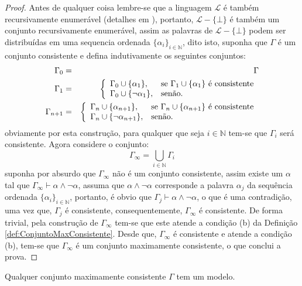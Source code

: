\begin{proof}
  Antes de qualquer coisa lembre-se que a linguagem $\mathcal{L}$ é também recursivamente enumerável (detalhes em \cite{ullman1992}), portanto, $\mathcal{L} - \{\bot\}$ é também um conjunto recursivamente enumerável, assim as palavras de $\mathcal{L} - \{\bot\}$ podem ser distribuídas em uma sequencia ordenada $\{\alpha_i\}_{i \in \mathbb{N}}$, dito isto, suponha que $\Gamma$ é um conjunto consistente e defina indutivamente os seguintes conjuntos:
  \begin{eqnarray*}
    \Gamma_0 & = & \Gamma\\
    \Gamma_1 & = & \left\{\begin{array}{ll}	\Gamma_0 \cup \{\alpha_1\}, & \hbox{se } \Gamma_1 \cup \{\alpha_1\} \hbox{ é consistente}\\ \Gamma_0 \cup \{\neg \alpha_1\},  & \hbox{senão.}\end{array}\right.\\
    \Gamma_{n+1} & = & \left\{\begin{array}{ll}	\Gamma_n \cup \{\alpha_{n+1}\}, & \hbox{se } \Gamma_n \cup \{\alpha_{n+1}\} \hbox{ é consistente}\\ \Gamma_n \cup \{\neg \alpha_{n+1}\},  & \hbox{senão.}\end{array}\right.
  \end{eqnarray*}
  obviamente por esta construção, para qualquer que seja $i \in \mathbb{N}$ tem-se que $\Gamma_i$ será consistente. Agora considere o conjunto:
  $$\Gamma_\infty = \bigcup_{i \in \mathbb{N}} \Gamma_i$$
  suponha por absurdo que $\Gamma_\infty$ não é um conjunto consistente,  assim existe um $\alpha$ tal que $\Gamma_\infty \vdash \alpha \land \neg \alpha$, assuma que $\alpha \land \neg \alpha$ corresponde a palavra $\alpha_j$ da sequência ordenada $\{\alpha_i\}_{i \in \mathbb{N}}$, portanto, é obvio que $\Gamma_j \vdash \alpha \land \neg \alpha$, o que é uma contradição, uma vez que, $\Gamma_j$ é consistente, consequentemente, $\Gamma_\infty$ é consistente. De forma trivial, pela construção de $\Gamma_\infty$ tem-se que este atende a condição (b) da Definição \ref{def:ConjuntoMaxConsistente}. Desde que, $\Gamma_\infty$ é consistente e atende a condição (b), tem-se que $\Gamma_\infty$ é um conjunto maximamente consistente, o que conclui a prova.
\end{proof}

\begin{teorema}\label{teo:ModeloParaMaximaneteConsistente}
  Qualquer conjunto maximamente consistente $\Gamma$ tem um modelo.
\end{teorema}


